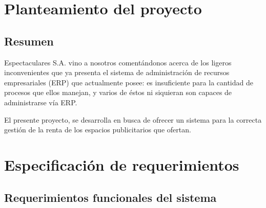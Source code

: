 \documentclass[12pt]{article}
\begin{document}
\newpage
{}
\tableofcontents
\newpage
{}
\section{Planteamiento del proyecto}
\subsection{Resumen}
Espectaculares S.A. vino a nosotros comentándonos acerca de los ligeros inconvenientes que ya presenta el sistema de administración de recursos empresariales (ERP) que actualmente posee: es insuficiente para la cantidad de procesos que ellos manejan, y varios de éstos ni siquieran son capaces de administrarse vía ERP.

El presente proyecto, se desarrolla en busca de ofrecer un sistema para la correcta gestión de la renta de los espacios publicitarios que ofertan.

\section{Especificación de requerimientos}

\subsection{Requerimientos funcionales del sistema}
\end{document}
